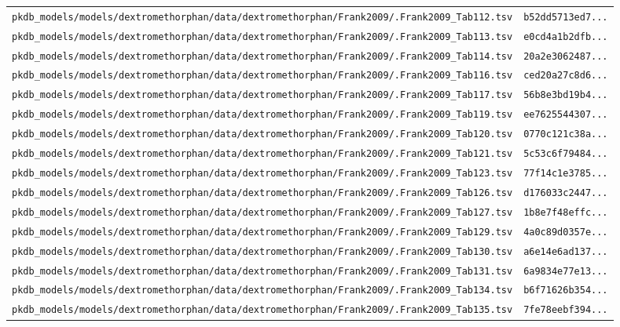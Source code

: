 \begin{longtable}{ll}
\texttt{pkdb\_models/models/dextromethorphan/data/dextromethorphan/Frank2009/.Frank2009\_Tab112.tsv} & \texttt{b52dd5713ed7...} \\
\texttt{pkdb\_models/models/dextromethorphan/data/dextromethorphan/Frank2009/.Frank2009\_Tab113.tsv} & \texttt{e0cd4a1b2dfb...} \\
\texttt{pkdb\_models/models/dextromethorphan/data/dextromethorphan/Frank2009/.Frank2009\_Tab114.tsv} & \texttt{20a2e3062487...} \\
\texttt{pkdb\_models/models/dextromethorphan/data/dextromethorphan/Frank2009/.Frank2009\_Tab116.tsv} & \texttt{ced20a27c8d6...} \\
\texttt{pkdb\_models/models/dextromethorphan/data/dextromethorphan/Frank2009/.Frank2009\_Tab117.tsv} & \texttt{56b8e3bd19b4...} \\
\texttt{pkdb\_models/models/dextromethorphan/data/dextromethorphan/Frank2009/.Frank2009\_Tab119.tsv} & \texttt{ee7625544307...} \\
\texttt{pkdb\_models/models/dextromethorphan/data/dextromethorphan/Frank2009/.Frank2009\_Tab120.tsv} & \texttt{0770c121c38a...} \\
\texttt{pkdb\_models/models/dextromethorphan/data/dextromethorphan/Frank2009/.Frank2009\_Tab121.tsv} & \texttt{5c53c6f79484...} \\
\texttt{pkdb\_models/models/dextromethorphan/data/dextromethorphan/Frank2009/.Frank2009\_Tab123.tsv} & \texttt{77f14c1e3785...} \\
\texttt{pkdb\_models/models/dextromethorphan/data/dextromethorphan/Frank2009/.Frank2009\_Tab126.tsv} & \texttt{d176033c2447...} \\
\texttt{pkdb\_models/models/dextromethorphan/data/dextromethorphan/Frank2009/.Frank2009\_Tab127.tsv} & \texttt{1b8e7f48effc...} \\
\texttt{pkdb\_models/models/dextromethorphan/data/dextromethorphan/Frank2009/.Frank2009\_Tab129.tsv} & \texttt{4a0c89d0357e...} \\
\texttt{pkdb\_models/models/dextromethorphan/data/dextromethorphan/Frank2009/.Frank2009\_Tab130.tsv} & \texttt{a6e14e6ad137...} \\
\texttt{pkdb\_models/models/dextromethorphan/data/dextromethorphan/Frank2009/.Frank2009\_Tab131.tsv} & \texttt{6a9834e77e13...} \\
\texttt{pkdb\_models/models/dextromethorphan/data/dextromethorphan/Frank2009/.Frank2009\_Tab134.tsv} & \texttt{b6f71626b354...} \\
\texttt{pkdb\_models/models/dextromethorphan/data/dextromethorphan/Frank2009/.Frank2009\_Tab135.tsv} & \texttt{7fe78eebf394...} \\

\end{longtable}
